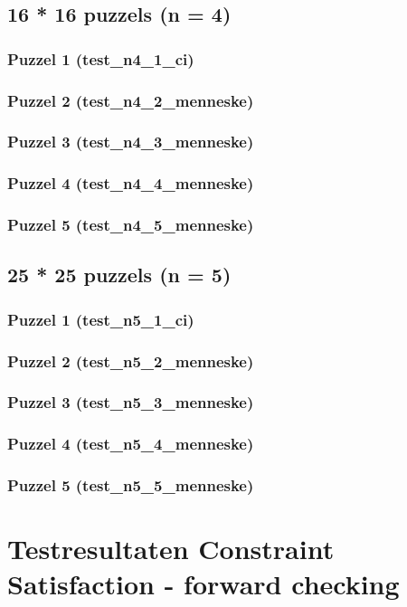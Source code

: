 \documentclass[]{report}
\begin{document}
\begin{appendices}
\section{16 * 16 puzzels (n = 4)}
\subsection{Puzzel 1 (test\_n4\_1\_ci)}

\subsection{Puzzel 2 (test\_n4\_2\_menneske)}
\subsection{Puzzel 3 (test\_n4\_3\_menneske)}
\subsection{Puzzel 4 (test\_n4\_4\_menneske)}
\subsection{Puzzel 5 (test\_n4\_5\_menneske)}
\section{25 * 25 puzzels (n = 5)}
\subsection{Puzzel 1 (test\_n5\_1\_ci)}

\subsection{Puzzel 2 (test\_n5\_2\_menneske)}
\subsection{Puzzel 3 (test\_n5\_3\_menneske)}
\subsection{Puzzel 4 (test\_n5\_4\_menneske)}
\subsection{Puzzel 5 (test\_n5\_5\_menneske)}

\chapter{Testresultaten Constraint Satisfaction - forward checking}

\end{appendices}
\end{document}
